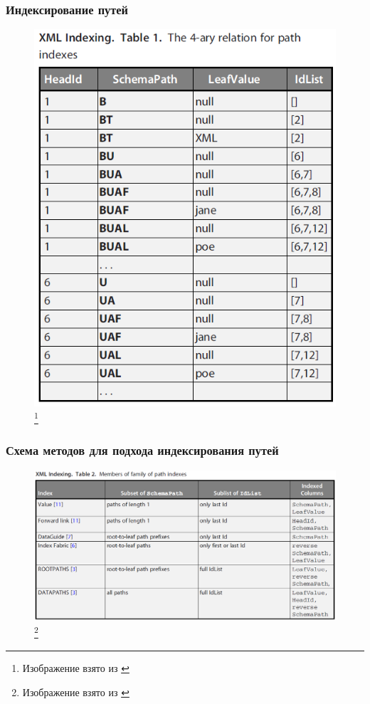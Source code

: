 \documentclass{beamer}
\begin{document}
\begin{frame}
\frametitle{Индексирование путей}
\begin{figure}[htb]
\includegraphics[width=\textwidth,height=0.80\textheight,keepaspectratio]{xml-pathindex.png} 
\footnote{\tiny{Изображение взято из \cite{Luna2009}}}
\end{figure}    
\end{frame}

\begin{frame}
\frametitle{Схема методов для подхода индексирования путей}
\begin{figure}[htb]
\includegraphics[width=\textwidth,height=0.80\textheight,keepaspectratio]{xml-pathindex2.png} 
\footnote{\tiny{Изображение взято из \cite{Luna2009}}}
\end{figure}    
\end{frame}
\end{document}
